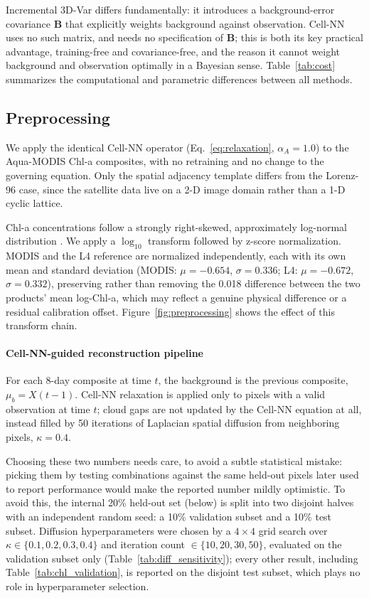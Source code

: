 \documentclass[final,5p,times,twocolumn,authoryear]{elsarticle}
\begin{document}
Incremental 3D-Var differs fundamentally: it introduces a
background-error covariance $\mathbf{B}$ that explicitly weights
background against observation. Cell-NN uses no such matrix, and
needs no specification of $\mathbf{B}$; this is both its key
practical advantage, training-free and covariance-free, and the
reason it cannot weight background and observation optimally in a
Bayesian sense. Table~\ref{tab:cost} summarizes the computational and
parametric differences between all methods.

\subsection{Preprocessing}

We apply the identical Cell-NN operator (Eq.~\eqref{eq:relaxation},
$\alpha_A=1.0$) to the Aqua-MODIS Chl-a composites, with no
retraining and no change to the governing equation. Only the spatial
adjacency template differs from the Lorenz-96 case, since the
satellite data live on a 2-D image domain rather than a 1-D cyclic
lattice.

Chl-a concentrations follow a strongly right-skewed, approximately
log-normal distribution \citep{campbell1995}. We apply a $\log_{10}$
transform followed by z-score normalization. MODIS and the L4
reference are normalized independently, each with its own mean and
standard deviation (MODIS: $\mu=-0.654$, $\sigma=0.336$; L4:
$\mu=-0.672$, $\sigma=0.332$), preserving rather than removing the
0.018 difference between the two products' mean log-Chl-a, which may
reflect a genuine physical difference or a residual calibration
offset. Figure~\ref{fig:preprocessing} shows the effect of this
transform chain.

\paragraph{Cell-NN-guided reconstruction pipeline}
\label{sec:pipeline}

For each 8-day composite at time $t$, the background is the previous
composite, $\mu_b = X(t-1)$. Cell-NN relaxation is applied only to
pixels with a valid observation at time $t$; cloud gaps are not
updated by the Cell-NN equation at all, instead filled by 50
iterations of Laplacian spatial diffusion from neighboring pixels,
$\kappa=0.4$.

Choosing these two numbers needs care, to avoid a subtle statistical
mistake: picking them by testing combinations against the same
held-out pixels later used to report performance would make the
reported number mildly optimistic. To avoid this, the internal 20\%
held-out set (below) is split into two disjoint halves with an
independent random seed: a 10\% validation subset and a 10\% test
subset. Diffusion hyperparameters were chosen by a $4\times4$ grid
search over $\kappa \in \{0.1, 0.2, 0.3, 0.4\}$ and iteration count
$\in \{10, 20, 30, 50\}$, evaluated on the validation subset only
(Table~\ref{tab:diff_sensitivity}); every other result, including
Table~\ref{tab:chl_validation}, is reported on the disjoint test
subset, which plays no role in hyperparameter selection.
\end{document}
